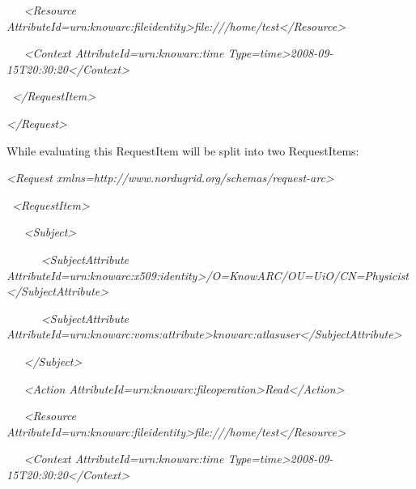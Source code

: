 \documentclass{article}
\begin{document}
{\itshape\color{black}
\ \ \ {\textless}Resource
AttributeId={\textquotedbl}urn:knowarc:fileidentity{\textgreater}file:///home/test{\textless}/Resource{\textgreater}}

{\itshape\color{black}
\ \ \ {\textless}Context
AttributeId={\textquotedbl}urn:knowarc:time{\textquotedbl}
Type={\textquotedbl}time{\textquotedbl}{\textgreater}2008-09-15T20:30:20{\textless}/Context{\textgreater}}

{\itshape\color{black}
\ {\textless}/RequestItem{\textgreater}}

{\itshape\color{black}
{\textless}/Request{\textgreater}}

{\color{black}
While evaluating this RequestItem will be split into two RequestItems:}

{\itshape\color{black}
{\textless}Request
xmlns={\textquotedbl}http://www.nordugrid.org/schemas/request-arc{\textquotedbl}{\textgreater}}

{\itshape\color{black}
\ {\textless}RequestItem{\textgreater}}

{\itshape\color{black}
\ \ \ {\textless}Subject{\textgreater}}

{\itshape\color{black}
\ \ \ \ \ \ {\textless}SubjectAttribute
AttributeId={\textquotedbl}urn:knowarc:x509:identity{\textquotedbl}{\textgreater}/O=KnowARC/OU=UiO/CN=Physicist{\textless}/SubjectAttribute{\textgreater}}

{\itshape\color{black}
\ \ \ \ \ \ {\textless}SubjectAttribute
AttributeId={\textquotedbl}urn:knowarc:voms:attribute{\textgreater}knowarc:atlasuser{\textless}/SubjectAttribute{\textgreater}}

{\itshape\color{black}
\ \ \ {\textless}/Subject{\textgreater}}

{\itshape\color{black}
\ \ \ {\textless}Action
AttributeId={\textquotedbl}urn:knowarc:fileoperation{\textquotedbl}{\textgreater}Read{\textless}/Action{\textgreater}}

{\itshape\color{black}
\ \ \ {\textless}Resource
AttributeId={\textquotedbl}urn:knowarc:fileidentity{\textgreater}file:///home/test{\textless}/Resource{\textgreater}}

{\itshape\color{black}
\ \ \ {\textless}Context
AttributeId={\textquotedbl}urn:knowarc:time{\textquotedbl}
Type={\textquotedbl}time{\textquotedbl}{\textgreater}2008-09-15T20:30:20{\textless}/Context{\textgreater}}
\end{document}
